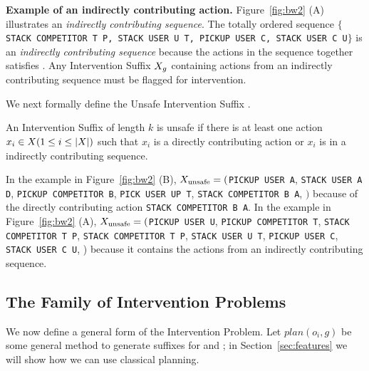 \textbf{Example of an indirectly contributing action.} 
 Figure~\ref{fig:bw2} (A) illustrates an \textit{indirectly contributing sequence}. 
The totally ordered sequence \texttt{$\lbrace$STACK COMPETITOR T P, STACK USER U T, PICKUP USER C, STACK USER C U$\rbrace$} is an \textit{indirectly contributing sequence} because the actions in the sequence together satisfies \dandu. 
Any Intervention Suffix $X_{g}$ containing actions from an indirectly contributing sequence must be flagged for intervention.


We next formally define the Unsafe Intervention Suffix \SuffixUnsafe.
\begin{definition}
\label{def:unsafe}
An Intervention Suffix \Suffix of length $k$ is unsafe if there is at least one action $x_i \in X (1\leq i\leq |X|)$ such that $x_i$ is a directly contributing action or $x_i$ is in a indirectly contributing sequence.
\end{definition}

\sloppy
In the example in Figure~\ref{fig:bw2} (B), $X_{\textnormal{unsafe}}=($\texttt{PICKUP USER A}, \texttt{STACK USER A D}, \texttt{PICKUP COMPETITOR B}, \texttt{PICK USER UP T}, \texttt{STACK COMPETITOR B A}, \undesired$)$ because of the directly contributing action \texttt{STACK COMPETITOR B A}. In the example in Figure~\ref{fig:bw2} (A), $X_{\textnormal{unsafe}}=($\texttt{PICKUP USER U}, \texttt{PICKUP COMPETITOR T}, \texttt{STACK COMPETITOR T P}, \texttt{STACK COMPETITOR T P}, \texttt{STACK USER U T}, \texttt{PICKUP USER C}, \texttt{STACK USER C U}, \dandu) because it contains the actions from an indirectly contributing sequence.

\subsection{The Family of Intervention Problems}
\label{sec:intervention-family}
We now define a general form of the Intervention Problem.
Let $plan(o_i, g)$ be some general method to generate suffixes for \planDesired and \planUndesired; in Section~\ref{sec:features} we will show how we can use classical planning.

